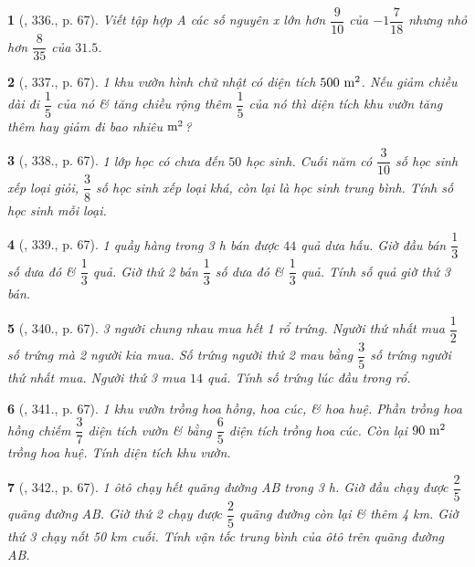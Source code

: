 \documentclass{article}
\newtheorem{baitoan}{}
\begin{document}
\begin{baitoan}[\cite{Tuyen_Toan_6}, 336., p. 67]
	Viết tập hợp A các số nguyên x lớn hơn $\dfrac{9}{10}$ của $-1\dfrac{7}{18}$ nhưng nhỏ hơn $\dfrac{8}{35}$ của $31.5$.
\end{baitoan}

\begin{baitoan}[\cite{Tuyen_Toan_6}, 337., p. 67]
	1 khu vườn hình chữ nhật có diện tích $\rm500\ m^2$. Nếu giảm chiều dài đi $\dfrac{1}{5}$ của nó \& tăng chiều rộng thêm $\dfrac{1}{5}$ của nó thì diện tích khu vườn tăng thêm hay giảm đi bao nhiêu $\rm m^2$?
\end{baitoan}

\begin{baitoan}[\cite{Tuyen_Toan_6}, 338., p. 67]
	1 lớp học có chưa đến $50$ học sinh. Cuối năm có $\dfrac{3}{10}$ số học sinh xếp loại giỏi, $\dfrac{3}{8}$ số học sinh xếp loại khá, còn lại là học sinh trung bình. Tính số học sinh mỗi loại.
\end{baitoan}

\begin{baitoan}[\cite{Tuyen_Toan_6}, 339., p. 67]
	1 quầy hàng trong {\rm3 h} bán được $44$ quả dưa hấu. Giờ đầu bán $\dfrac{1}{3}$ số dưa đó \& $\dfrac{1}{3}$ quả. Giờ thứ 2 bán $\dfrac{1}{3}$ số dưa đó \& $\dfrac{1}{3}$ quả. Tính số quả giờ thứ 3 bán.
\end{baitoan}

\begin{baitoan}[\cite{Tuyen_Toan_6}, 340., p. 67]
	3 người chung nhau mua hết 1 rổ trứng. Người thứ nhất mua $\dfrac{1}{2}$ số trứng mà 2 người kia mua. Số trứng người thứ 2 mau bằng $\dfrac{3}{5}$ số trứng người thứ nhất mua. Người thứ 3 mua $14$ quả. Tính số trứng lúc đầu trong rổ.
\end{baitoan}

\begin{baitoan}[\cite{Tuyen_Toan_6}, 341., p. 67]
	1 khu vườn trồng hoa hồng, hoa cúc, \& hoa huệ. Phần trồng hoa hồng chiếm $\dfrac{3}{7}$ diện tích vườn \& bằng $\dfrac{6}{5}$ diện tích trồng hoa cúc. Còn lại $\rm90\ m^2$ trồng hoa huệ. Tính diện tích khu vườn.
\end{baitoan}

\begin{baitoan}[\cite{Tuyen_Toan_6}, 342., p. 67]
	1 ôtô chạy hết quãng đường AB trong {\rm3 h}. Giờ đầu chạy được $\dfrac{2}{5}$ quãng đường AB. Giờ thứ 2 chạy được $\dfrac{2}{5}$ quãng đường còn lại \& thêm {\rm4 km}. Giờ thứ 3 chạy nốt {\rm50 km} cuối. Tính vận tốc trung bình của ôtô trên quãng đường AB.
\end{baitoan}
\end{document}
